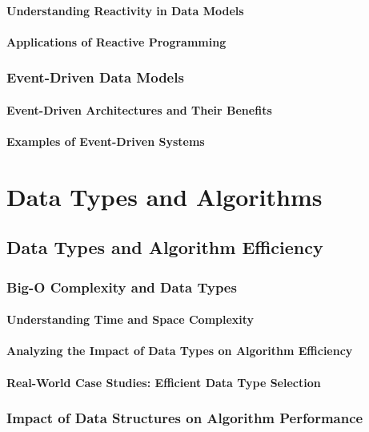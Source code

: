 \documentclass[12pt, oneside]{book}
\begin{document}
\subsubsection{Understanding Reactivity in Data Models}
\subsubsection{Applications of Reactive Programming}
\subsection{Event-Driven Data Models}
\subsubsection{Event-Driven Architectures and Their Benefits}
\subsubsection{Examples of Event-Driven Systems}

\chapter{Data Types and Algorithms}
\section{Data Types and Algorithm Efficiency}
\subsection{Big-O Complexity and Data Types}
\subsubsection{Understanding Time and Space Complexity}
\subsubsection{Analyzing the Impact of Data Types on Algorithm Efficiency}
\subsubsection{Real-World Case Studies: Efficient Data Type Selection}
\subsection{Impact of Data Structures on Algorithm Performance}
\end{document}
